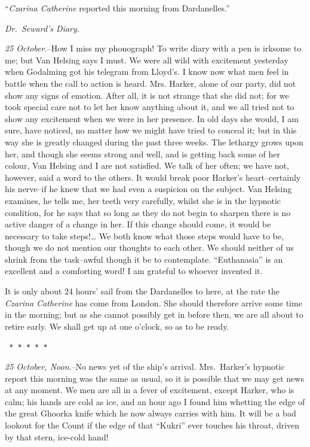 \documentclass[12pt,openright]{book}
\begin{document}
“\textit{Czarina Catherine} reported this morning from Dardanelles.”

\textit{Dr. Seward’s Diary.}

\textit{25 October.}–How I miss my phonograph! To write diary with a pen is irksome to me; but Van Helsing says I must. We were all wild with excitement yesterday when Godalming got his telegram from Lloyd’s. I know now what men feel in battle when the call to action is heard. Mrs. Harker, alone of our party, did not show any signs of emotion. After all, it is not strange that she did not; for we took special care not to let her know anything about it, and we all tried not to show any excitement when we were in her presence. In old days she would, I am sure, have noticed, no matter how we might have tried to conceal it; but in this way she is greatly changed during the past three weeks. The lethargy grows upon her, and though she seems strong and well, and is getting back some of her colour, Van Helsing and I are not satisfied. We talk of her often; we have not, however, said a word to the others. It would break poor Harker’s heart–certainly his nerve–if he knew that we had even a suspicion on the subject. Van Helsing examines, he tells me, her teeth very carefully, whilst she is in the hypnotic condition, for he says that so long as they do not begin to sharpen there is no active danger of a change in her. If this change should come, it would be necessary to take steps!… We both know what those steps would have to be, though we do not mention our thoughts to each other. We should neither of us shrink from the task–awful though it be to contemplate. “Euthanasia” is an excellent and a comforting word! I am grateful to whoever invented it.

It is only about 24 hours’ sail from the Dardanelles to here, at the rate the \textit{Czarina Catherine} has come from London. She should therefore arrive some time in the morning; but as she cannot possibly get in before then, we are all about to retire early. We shall get up at one o’clock, so as to be ready.

\texttt{   *       *       *       *       *}

\textit{25 October, Noon}.–No news yet of the ship’s arrival. Mrs. Harker’s hypnotic report this morning was the same as usual, so it is possible that we may get news at any moment. We men are all in a fever of excitement, except Harker, who is calm; his hands are cold as ice, and an hour ago I found him whetting the edge of the great Ghoorka knife which he now always carries with him. It will be a bad lookout for the Count if the edge of that “Kukri” ever touches his throat, driven by that stern, ice-cold hand!
\end{document}
